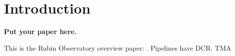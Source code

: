 \section{Introduction}

\textbf{Put your paper here.}
\vskip 0.4in



This is the Rubin Observatory overview paper: \citet{2019ApJ...873..111I}.
Pipelines have \gls{DCR}.
\gls{TMA}
